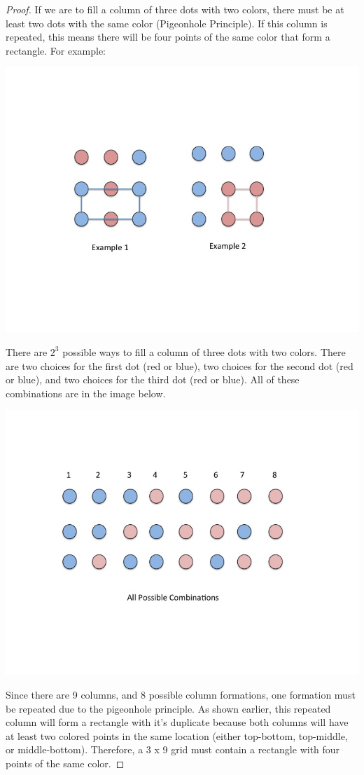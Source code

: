 \documentclass[10pt,letter]{article}
\begin{document}
\begin{proof}
If we are to fill a column of three dots with two colors, there must be at least two dots with the same color (Pigeonhole Principle). If this column is repeated, this means there will be four points of the same color that form a rectangle.
For example: \\
\begin{minipage}{.8\textwidth}
\includegraphics[width=.8\linewidth]{Slide1.jpg}
\end{minipage}

There are $2^3$ possible ways to fill a column of three dots with two colors. There are two choices for the first dot (red or blue), two choices for the second dot (red or blue), and two choices for the third dot (red or blue). All of these combinations are in the image below.

\begin{minipage}{.8\textwidth}
\includegraphics[width=.8\linewidth]{Slide2.jpg}
\end{minipage}

Since there are 9 columns, and 8 possible column formations, one formation must be repeated due to the pigeonhole principle. As shown earlier, this repeated column will form a rectangle with it's duplicate because both columns will have at least two colored points in the same location (either top-bottom, top-middle, or middle-bottom). Therefore, a 3 x 9 grid must contain a rectangle with four points of the same color. 
\end{proof}
\end{document}
